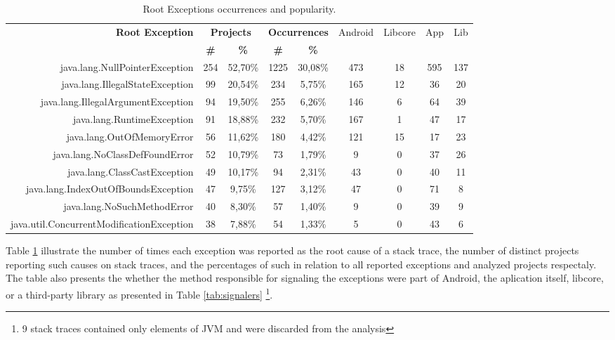 \documentclass[conference]{IEEEtran}
\begin{document}
\begin{table}
  \centering
  \begin{tabular}{rcccccccc}
    \hline
    \bfseries{Root Exception} &  \multicolumn{2}{c}{\bfseries{Projects}} &  \multicolumn{2}{c}{\bfseries{Occurrences}} & \textsf{Android} & \textsf{Libcore} & \textsf{App} & \textsf{Lib} \\
    & \bfseries{\#} &  \bfseries{\%} & \bfseries{\# } & \bfseries{\% } &&&&\\
    \hline
java.lang.NullPointerException            & 254 & 52,70\%  & 1225 & 30,08\% & 473 & 18 & 595 & 137 \\
java.lang.IllegalStateException          & 99  & 20,54\%  & 234  & 5,75\%  & 165 & 12 & 36  & 20  \\
java.lang.IllegalArgumentException          & 94  & 19,50\% & 255  & 6,26\% & 146 & 6  & 64  & 39   \\
java.lang.RuntimeException                & 91  & 18,88\% & 232  & 5,70\%  & 167 & 1  & 47  & 17   \\
java.lang.OutOfMemoryError                 & 56  & 11,62\% & 180  & 4,42\% & 121 & 15 & 17  & 23   \\
java.lang.NoClassDefFoundError           & 52  & 10,79\%  & 73   & 1,79\%  & 9   & 0  & 37  & 26   \\
java.lang.ClassCastException             & 49  & 10,17\%  & 94   & 2,31\%  & 43  & 0  & 40  & 11   \\
java.lang.IndexOutOfBoundsException       & 47  & 9,75\%   & 127  & 3,12\% & 47  & 0  & 71  & 8    \\
java.lang.NoSuchMethodError               & 40  & 8,30\%  & 57   & 1,40\%  & 9   & 0  & 39  & 9   \\
java.util.ConcurrentModificationException & 38  & 7,88\% & 54   & 1,33\%   & 5   & 0  & 43  & 6   \\

    \hline
  \end{tabular}
\caption{Root Exceptions occurrences and popularity.}
\label{tab:toptenandroid}
\end{table}


Table \ref{tab:toptenandroid} illustrate the number of times each exception was reported as 
the root cause of a stack trace, the number of distinct projects reporting such causes on stack traces, 
and the percentages of such in relation to all reported exceptions and analyzed projects respectaly.
The table also presents the whether the method responsible for signaling the exceptions were
part of Android, the aplication itself, libcore, or a third-party library as presented in Table  \ref{tab:signalers}  \footnote{9 stack traces contained only elements of JVM and were discarded from the analysis}.
\end{document}
